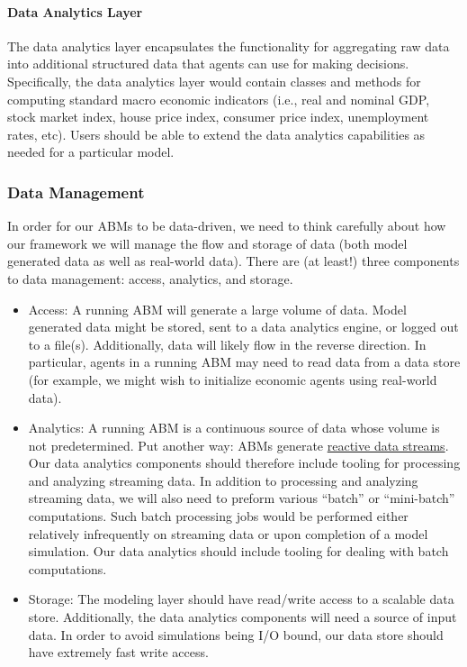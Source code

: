 \documentclass[11pt]{amsart}
\begin{document}
\paragraph{Data Analytics Layer}
The data analytics layer encapsulates the functionality for aggregating raw data into additional structured data that agents can use for making decisions.  Specifically, the data analytics layer would contain classes and methods for computing standard macro economic indicators (i.e., real and nominal GDP, stock market index, house price index, consumer price index, unemployment rates, etc). Users should be able to extend the data analytics capabilities as needed for a particular model.


\subsubsection{Data Management}
In order for our ABMs to be data-driven, we need to think carefully about how our framework we will manage the flow and storage of data (both model generated data as well as real-world data). There are (at least!) three components to data management: access, analytics, and storage.
\begin{itemize}
    \item Access: A running ABM will generate a large volume of data. Model generated data might be stored, sent to a data analytics engine, or logged out to a file(s). Additionally, data will likely flow in the reverse direction.  In particular, agents in a running ABM may need to read data from a data store (for example, we might wish to initialize economic agents using real-world data).
    \item Analytics: A running ABM is a continuous source of data whose volume is not predetermined. Put another way: ABMs generate \href{http://www.reactive-streams.org/}{reactive data streams}.  Our data analytics components should therefore include tooling for processing and analyzing streaming data. In addition to processing and analyzing streaming data, we will also need to preform various ``batch'' or ``mini-batch'' computations. Such batch processing jobs would be performed either relatively infrequently on streaming data or upon completion of a model simulation. Our data analytics should include tooling for dealing with batch computations.
    \item Storage: The modeling layer should have read/write access to a scalable data store. Additionally, the data analytics components will need a source of input data. In order to avoid simulations being I/O bound, our data store should have extremely fast write access.
\end{itemize}
\end{document}
